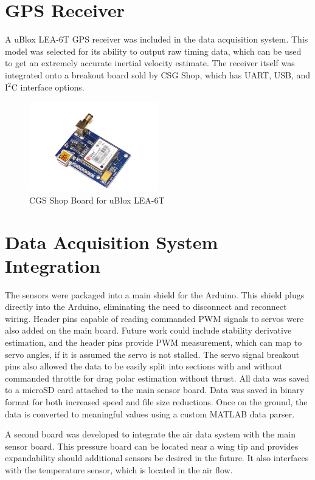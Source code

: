 \section{GPS Receiver}
A uBlox LEA-6T GPS receiver was included in the data acquisition system. This model was selected for its ability to output raw timing data, which can be used to get an extremely accurate inertial velocity estimate\cite{ubloxDemo}. The receiver itself was integrated onto a breakout board sold by CSG Shop, which has UART, USB, and I$^2$C interface options. 

\begin{figure}[H]
  \centering
    \includegraphics[width=0.5\textwidth]{figures/gpsNoBack.jpg}
  \caption{CGS Shop Board for uBlox LEA-6T} \label{gpsPicture}
\end{figure}

\section{Data Acquisition System Integration}
The sensors were packaged into a main shield for the Arduino. This shield plugs directly into the Arduino, eliminating the need to disconnect and reconnect wiring. Header pins capable of reading commanded PWM signals to servos were also added on the main board. Future work could include stability derivative estimation, and the header pins provide PWM measurement, which can map to servo angles, if it is assumed the servo is not stalled. The servo signal breakout pins also allowed the data to be easily split into sections with and without commanded throttle for drag polar estimation without thrust. All data was saved to a microSD card attached to the main sensor board. Data was saved in binary format for both increased speed and file size reductions. Once on the ground, the data is converted to meaningful values using a custom MATLAB data parser.

A second board was developed to integrate the air data system with the main sensor board. This pressure board can be located near a wing tip and provides expandability should additional sensors be desired in the future. It also interfaces with the temperature sensor, which is located in the air flow.